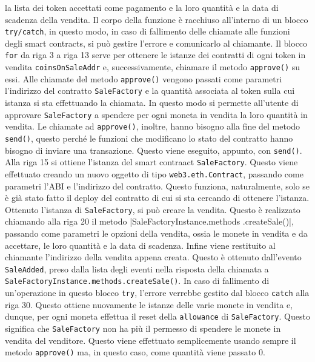 \documentclass[a4paper]{article}
\begin{document}
        la lista dei token accettati come pagamento e la loro quantità e la data di scadenza della vendita.
        \newline
        Il corpo della funzione è racchiuso all'interno di un blocco \verb|try/catch|, in questo modo, in caso di fallimento delle chiamate alle funzioni degli smart contracts, si può gestire l'errore e comunicarlo al chiamante.
        \newline
        Il blocco \verb|for| da riga 3 a riga 13 serve per ottenere le istanze dei contratti di ogni token in vendita \verb|coinsOnSaleAddr| e, successivamente, chiamare il metodo \verb|approve()| su essi.
        Alle chiamate del metodo \verb|approve()| vengono passati come parametri l'indirizzo del contratto \verb|SaleFactory| e la quantità associata al token sulla cui istanza si sta effettuando la chiamata.
        In questo modo si permette all'utente di approvare \verb|SaleFactory| a spendere per ogni moneta in vendita la loro quantità in vendita.
        \newline
        Le chiamate ad \verb|approve()|, inoltre, hanno bisogno alla fine del metodo \verb|send()|,
        questo perché le funzioni che modificano lo stato del contratto hanno bisogno di inviare una transazione. Questo viene eseguito, appunto, con \verb|send()|\cite{soliditysend}.
        \newline
        Alla riga 15 si ottiene l'istanza del smart contraact \verb|SaleFactory|. Questo viene effettuato creando un nuovo oggetto di tipo \verb|web3.eth.Contract|, passando come parametri l'ABI e l'indirizzo del contratto.
        Questo funziona, naturalmente, solo se è già stato fatto il deploy del contratto di cui si sta cercando di ottenere l'istanza.
        \newline
        Ottenuto l'istanza di \verb|SaleFactory|, si può creare la vendita. Questo è realizzato chiamando alla riga 20 il metodo \spverb|SaleFactoryInstance.methods .createSale()|, passando come parametri le opzioni della vendita,
        ossia le monete in vendita e da accettare, le loro quantità e la data di scadenza.
        \newline
        Infine viene restituito al chiamante l'indirizzo della vendita appena creata. Questo è ottenuto dall'evento \verb|SaleAdded|, preso dalla lista degli eventi nella risposta della chiamata a \verb|SaleFactoryInstance.methods.createSale()|.
        \newline
        In caso di fallimento di un'operazione in questo blocco \verb|try|, l'errore verrebbe gestito dal blocco \verb|catch| alla riga 30. Questo ottiene nuovamente le istanze delle varie monete in vendita e, dunque, per ogni moneta effettua il reset della
        \verb|allowance| di \verb|SaleFactory|. Questo significa che \verb|SaleFactory| non ha più il permesso di spendere le monete in vendita del venditore. Questo viene effettuato semplicemente usando sempre il metodo \verb|approve()| ma, in questo caso,
        come quantità viene passato 0.
\end{document}
